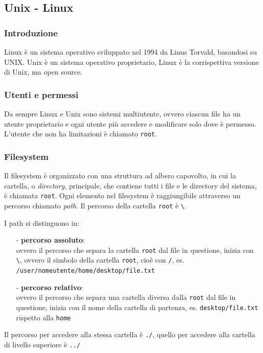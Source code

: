 \documentclass[a4paper]{article}
\begin{document}
\newpage


\subsection{Unix - Linux}
\subsubsection*{Introduzione}
Linux è un sistema operativo sviluppato nel 1994 da Linus Torvald, basandosi su UNIX.
Unix è un sistema operativo proprietario, Linux è la corrispettiva versione di Unix, ma open source.

\subsubsection*{Utenti e permessi}
Da sempre Linux e Unix sono sistemi multiutente, ovvero ciascun file ha un utente proprietario e ogni utente più accedere
e modificare solo dove è permesso. L'utente che non ha limitazioni è chiamato \verb|root|.

\subsubsection*{Filesystem}
Il filesystem è organizzato con una struttura ad albero capovolto, in cui la cartella, o \textit{directory}, principale,
che contiene tutti i file e le directory del sistema, è chiamata \verb|root|. Ogni elemento nel filesystem è raggiungibile
attraverso un percorso chiamato \textit{path}. Il percorso della cartella \verb|root| è \verb|\|.

I path si distinguono in:
\begin{itemize} [topsep=3pt, itemsep=0pt]
	\item[-] \textbf{percorso assoluto}: \\
	ovvero il percorso che separa la cartella \verb|root| dal file in questione, inizia con \verb|\|, ovvero il simbolo della
	cartella \verb|root|, cioè con \verb|/|, es. \verb|/user/nomeutente/home/desktop/file.txt|
	\item[-] \textbf{percorso relativo}: \\
	ovvero il percorso che separa una cartella diversa dalla \verb|root| dal file in questione, inizia con il nome della cartella
	di partenza, es. \verb|desktop/file.txt| rispetto alla \verb|home|
\end{itemize}
Il percorso per accedere alla stessa cartella è \verb|./|, quello per accedere alla cartella di livello superiore è \verb|../|
\end{document}
